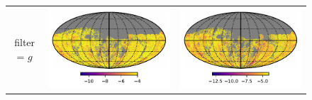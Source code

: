 \documentclass[preprintm,linenumbers]{aastex631}
\begin{document}
\begin{figure}
\begin{tabular}{@{}c@{}c@{}c@{}}
				filter = $g$ & \includegraphics[align=t]{results/skymaps/skymaps_delta_first_year_one_snap_v4_0_10yrs_db_noDD_noTwi_CountMetric_doAllTemplateMetrics_reduceCount_g_7_noDD_noTwi} &				
				\includegraphics[align=t]{results/skymaps/skymaps_delta_first_year_one_snap_v4_0_10yrs_db_noDD_noTwi_CountMetric_doAllTemplateMetrics_reduceCount_g_28_noDD_noTwi} \\
				

\end{tabular}
\end{figure}
\end{document}
